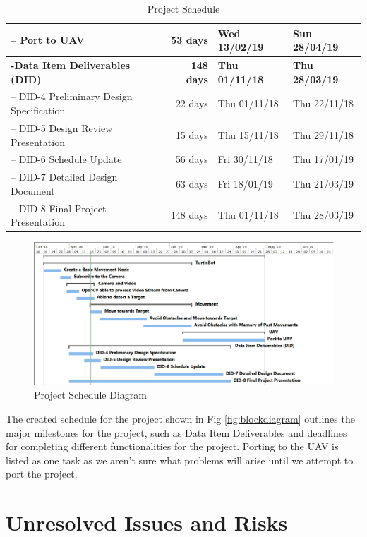 \documentclass{article}
\begin{document}
\begin{table}[H]
\begin{tabular}{|l|r|l|l|}
		-- Port to UAV                                      & 53 days           & Wed 13/02/19          & Sun 28/04/19          \\ \hline
		\textbf{-Data Item Deliverables (DID)}		    & \textbf{148 days} & \textbf{Thu 01/11/18} & \textbf{Thu 28/03/19} \\ \hline
		-- DID-4 Preliminary Design Specification	    & 22 days		& Thu 01/11/18		& Thu 22/11/18		\\ \hline
		-- DID-5 Design Review Presentation		    & 15 days		& Thu 15/11/18		& Thu 29/11/18		\\ \hline
		-- DID-6 Schedule Update			    & 56 days		& Fri 30/11/18		& Thu 17/01/19		\\ \hline
		-- DID-7 Detailed Design Document		    & 63 days		& Fri 18/01/19		& Thu 21/03/19		\\ \hline
		-- DID-8 Final Project Presentation		    & 148 days		& Thu 01/11/18		& Thu 28/03/19		\\ \hline

	\end{tabular}
	\caption{Project Schedule}
	\label{table:projectscheduletable}
\end{table}

\begin{figure}[H]
	\centering
	\includegraphics[width=\linewidth]{ScheduleUpdated}
	\caption{Project Schedule Diagram}
	\label{fig:schedulediagram}
\end{figure}

	The created schedule for the project shown in Fig \ref{fig:blockdiagram} outlines the major milestones for the project, such as Data Item Deliverables and deadlines for completing different functionalities for the project. Porting to the UAV is listed as one task as we aren't sure what problems will arise until we attempt to port the project.  

\section{Unresolved Issues and Risks}
\end{document}
